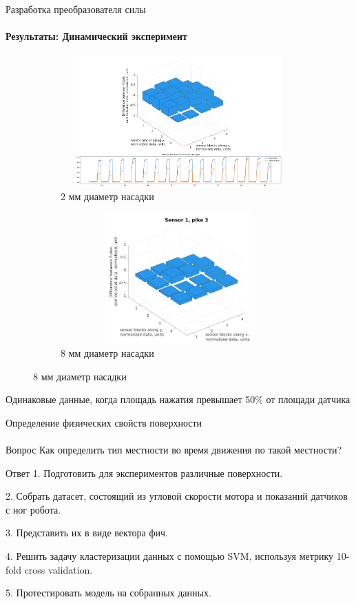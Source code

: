 \documentclass[aspectratio=169,xcolor=table]{beamer}
\begin{document}
\begin{frame}[t]{Разработка преобразователя силы}
    \framesubtitle{Результаты: Динамический эксперимент}
    \vspace{-15pt}
    \begin{figure}[H]
        \begin{subfigure}{0.64\textwidth}
            \centering\includegraphics[height=5cm,width=1\textwidth,keepaspectratio]{sens1_pike1_mod.png}
            \caption*{2 мм диаметр насадки}
            \label{fig:sens1_pike1}
        \end{subfigure}
        \begin{subfigure}{0.34\textwidth}
            \centering\includegraphics[height=5cm,width=1\textwidth,keepaspectratio]{sens1_pike3.png}
            \caption*{8 мм диаметр насадки}
            \label{fig:sens1_pike3}
        \end{subfigure}
    \end{figure}
    \vspace{-0.8cm}
    \alert{Одинаковые данные, когда площадь нажатия превышает 50\% от площади датчика}
\end{frame}

\begin{frame}[t]{Определение физических свойств поверхности}
    \framesubtitle{}
    \vspace{-0.3cm}
    {\large\begin{block}{Вопрос}
        Как определить тип местности во время движения по такой местности?
        \end{block}}
    {\large\begin{alertblock}{Ответ}
        1. Подготовить для экспериментов различные поверхности.

        2. Собрать датасет, состоящий из угловой скорости мотора и показаний датчиков с ног робота.

        3. Представить их в виде вектора фич.

        4. Решить задачу кластеризации данных с помощью SVM, используя метрику 10-fold cross validation. 

        5. Протестировать модель на собранных данных.
        \end{alertblock}}
\end{frame}
\end{document}
